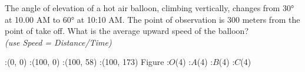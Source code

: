 
%
%
%
%
% 

\question[6] The angle of elevation of a hot air balloon, climbing vertically, changes from $\ang{30}$ at 10.00 AM to $\ang{60}$ at 10:10 AM. The point of observation is 300 meters from the point of take off. What is the average upward speed of the balloon? \\
\textit{(use Speed = Distance/Time)}

\ifprintanswers
	\begin{marginfigure}
		:(0, 0)
		:(100, 0)
		:(100, 58)
		:(100, 173)
		\figdrawbegin{}
			\figdrawline[1,2,3,4,1]
			\figdrawline[3,1]
		\figdrawend
		\figvisu{\figBoxA} {Figure}
		{
			:$O$(4)
			:$A$(4)
			:$B$(4)
			:$C$(4)
		}
		\centerline{\box\figBoxA}
	\end{marginfigure}
\fi 

